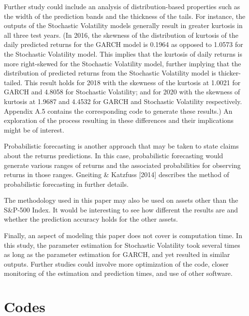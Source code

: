 \documentclass[12pt,letterpaper,reqno,fleqn]{article}
\begin{document}
Further study could include an analysis of distribution-based properties such as the width of the prediction bands and the thickness of the tails. For instance, the outputs of the Stochastic Volatility models generally result in greater kurtosis in all three test years. (In 2016, the skewness of the distribution of kurtosis of the daily predicted returns for the GARCH model is 0.1964 as opposed to 1.0573 for the Stochastic Volatility model. This implies that the kurtosis of daily returns is more right-skewed for the Stochastic Volatility model, further implying that the distribution of predicted returns from the Stochastic Volatility model is thicker-tailed. This result holds for 2018 with the skewness of the kurtosis at 1.0021 for GARCH and 4.8058 for Stochastic Volatility; and for 2020 with the skewness of kurtosis at 1.9687 and 4.4532 for GARCH and Stochastic Volatility respectively. Appendix A.5 contains the corresponding code to generate these results.) An exploration of  the process resulting in these differences and their implications might be of interest.

Probabilistic forecasting is another approach that may be taken to state claims about the returns predictions. In this case, probabilistic forecasting would generate various ranges of returns and the associated probabilities for observing returns in those ranges. Gneiting \& Katzfuss [2014] describes the method of probabilistic forecasting in further details.

The methodology used in this paper may also be used on assets other than the S\&P-500 Index. It would be interesting to see how different the results are and whether the prediction accuracy holds for the other assets.

Finally, an aspect of modeling this paper does not cover is computation time. In this study, the parameter estimation for Stochastic Volatility took several times as long as the parameter estimation for GARCH, and yet resulted in similar outputs. Further studies could involve more optimization of the code, closer monitoring of the estimation and prediction times, and use of other software.   

\newpage

\appendix
\section{Codes}
\end{document}
